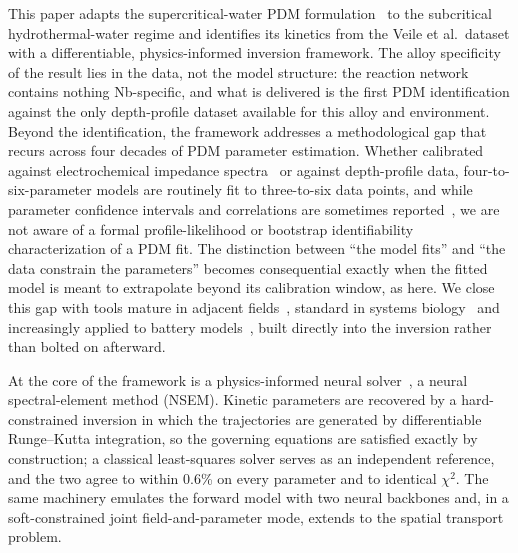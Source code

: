 \documentclass[preprint,12pt]{elsarticle}
\begin{document}
This paper adapts the supercritical-water PDM
formulation~\citep{li2020scwpdm} to the subcritical hydrothermal-water
regime and identifies its kinetics from the Veile et al.\ dataset with a
differentiable, physics-informed inversion framework. The alloy
specificity of the result lies in the data, not the model structure:
the reaction network contains nothing Nb-specific, and what is delivered
is the first PDM identification against the only depth-profile dataset
available for this alloy and environment. Beyond the identification, the
framework addresses a methodological gap that recurs across four decades
of PDM parameter estimation. Whether calibrated against electrochemical
impedance spectra~\citep{bojinov_mcm,ss316ln_pdm2024,ss321_pdm} or
against depth-profile data, four-to-six-parameter models are routinely
fit to three-to-six data points, and while parameter confidence
intervals and correlations are sometimes
reported~\citep{identifiability_electrochem1996}, we are not aware of a
formal profile-likelihood or bootstrap identifiability characterization
of a PDM fit. The distinction between ``the model fits'' and ``the data
constrain the parameters'' becomes consequential exactly when the fitted
model is meant to extrapolate beyond its calibration window, as here.
We close this gap with tools mature in adjacent
fields~\citep{raue2009identifiability,efron1979bootstrap,wieland2021identifiability},
standard in systems biology~\citep{biosystems_identifiability} and
increasingly applied to battery models~\citep{p2d_identifiability2021},
built directly into the inversion rather than bolted on afterward.

At the core of the framework is a physics-informed neural
solver~\citep{raissi2019pinn,karniadakis2021piml}, a neural
spectral-element method (NSEM). Kinetic parameters
are recovered by a hard-constrained inversion in which the trajectories
are generated by differentiable Runge--Kutta integration, so the
governing equations are satisfied exactly by construction; a classical
least-squares solver serves as an independent reference, and the two
agree to within 0.6\% on every parameter and to identical $\chi^2$. The
same machinery emulates the forward model with two neural backbones and,
in a soft-constrained joint field-and-parameter mode, extends to the
spatial transport problem.
\end{document}
